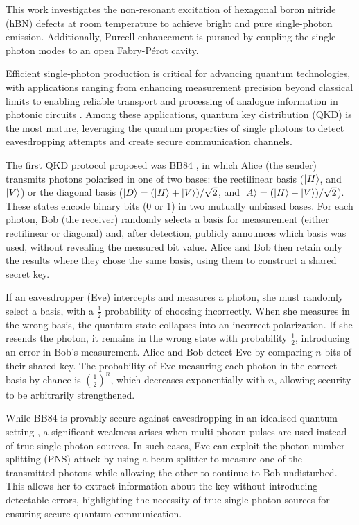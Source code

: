 This work investigates the non-resonant excitation of hexagonal boron nitride (hBN) defects at room temperature to achieve bright and pure single-photon emission. Additionally, Purcell enhancement is pursued by coupling the single-photon modes to an open Fabry-Pérot cavity.

Efficient single-photon production is critical for advancing quantum technologies, with applications ranging from enhancing measurement precision beyond classical limits \cite{Nagata2007, Vitelli2010} to enabling reliable transport and processing of analogue information in photonic circuits \cite{Bogaerts2020}. Among these applications, quantum key distribution (QKD) is the most mature, leveraging the quantum properties of single photons to detect eavesdropping attempts and create secure communication channels. 

The first QKD protocol proposed was BB84 \cite{Bennett2014}, in which Alice (the sender) transmits photons polarised in one of two bases: the rectilinear basis ($\ket{H}$, and $\ket{V}$) or the diagonal basis ($\ket{D}=(\ket{H}+\ket{V})/\sqrt{2}$, and $\ket{A}=(\ket{H}-\ket{V})/\sqrt{2}$). These states encode binary bits (0 or 1) in two mutually unbiased bases. For each photon, Bob (the receiver) randomly selects a basis for measurement (either rectilinear or diagonal) and, after detection, publicly announces which basis was used, without revealing the measured bit value. Alice and Bob then retain only the results where they chose the same basis, using them to construct a shared secret key.

If an eavesdropper (Eve) intercepts and measures a photon, she must randomly select a basis, with a \( \frac{1}{2} \) probability of choosing incorrectly. When she measures in the wrong basis, the quantum state collapses into an incorrect polarization. If she resends the photon, it remains in the wrong state with probability \( \frac{1}{2} \), introducing an error in Bob’s measurement. Alice and Bob detect Eve by comparing \( n \) bits of their shared key. The probability of Eve measuring each photon in the correct basis by chance is \( \left(\frac{1}{2}\right)^n \), which decreases exponentially with \( n \), allowing security to be arbitrarily strengthened.

While BB84 is provably secure against eavesdropping in an idealised quantum setting \cite{Shor2000}, a significant weakness arises when multi-photon pulses are used instead of true single-photon sources. In such cases, Eve can exploit the photon-number splitting (PNS) attack by using a beam splitter to measure one of the transmitted photons while allowing the other to continue to Bob undisturbed. This allows her to extract information about the key without introducing detectable errors, highlighting the necessity of true single-photon sources for ensuring secure quantum communication.


